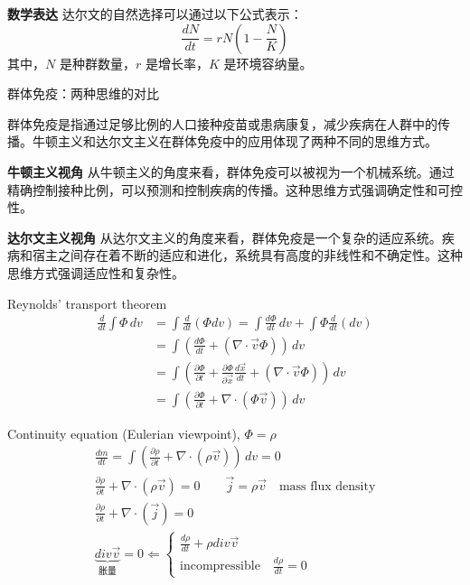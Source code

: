 \documentclass[12pt, a4paper, oneside, UTF8]{ctexbook}  %
\newcommand{\pa}{\partial}
\begin{document}
\begin{add}
\textbf{数学表达}
达尔文的自然选择可以通过以下公式表示：
\begin{equation*}
    \frac{dN}{dt} = rN \left(1 - \frac{N}{K}\right)
\end{equation*}
其中，$N$ 是种群数量，$r$ 是增长率，$K$ 是环境容纳量。

\begin{center}
	群体免疫：两种思维的对比
\end{center}
群体免疫是指通过足够比例的人口接种疫苗或患病康复，减少疾病在人群中的传播。牛顿主义和达尔文主义在群体免疫中的应用体现了两种不同的思维方式。

\textbf{牛顿主义视角}
从牛顿主义的角度来看，群体免疫可以被视为一个机械系统。通过精确控制接种比例，可以预测和控制疾病的传播。这种思维方式强调确定性和可控性。

\textbf{达尔文主义视角}
从达尔文主义的角度来看，群体免疫是一个复杂的适应系统。疾病和宿主之间存在着不断的适应和进化，系统具有高度的非线性和不确定性。这种思维方式强调适应性和复杂性。
\end{add}
\begin{defn}
	Reynolds' transport theorem
	\begin{align*}
		\frac{d}{dt}\int \Phi\,dv&=\int \frac{d}{dt}(\Phi dv)
		=\int \frac{d\Phi}{dt}\, dv+\int\Phi \frac{d}{dt}( dv)\\
		&=\int\left(\frac{d\Phi}{dt}+(\nabla\cdot\vec{v}\Phi)\right)\,dv\\
		&=\int \left(\frac{\pa \Phi}{\pa t}+\frac{\pa \Phi}{\pa\vec{x}}
		\frac{d\vec{x}}{dt}+(\nabla\cdot\vec{v}\Phi)\right)\,dv\\
		&=\int \left(\frac{\pa \Phi}{\pa t}+\nabla\cdot(\Phi\vec{v})\right)\,dv
	\end{align*}
\end{defn}
\begin{defn}
	Continuity equation	(Eulerian viewpoint), $\Phi=\rho$
	\begin{gather*}
		\frac{dm}{dt}=\int \left(\frac{\pa \rho}{\pa t}+\nabla\cdot(\rho\vec{v})\right)\,dv=0\\
		\frac{\pa \rho}{\pa t}+\nabla\cdot(\rho\vec{v})=0\qquad
		\vec{j}=\rho\vec{v}\quad\text{mass flux density}\\
		\frac{\pa \rho}{\pa t}+\nabla\cdot(\vec{j})=0\\
		\underbrace{div\vec{v}}_{\text{胀量}}=0\Leftarrow
		\begin{cases}
			\frac{d\rho}{dt}+\rho div\vec{v}\\
			\text{incompressible}\quad\frac{d\rho}{dt}=0
		\end{cases}
	\end{gather*}
\end{defn}
\end{document}
